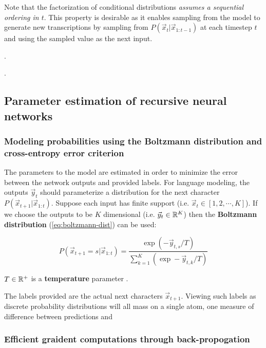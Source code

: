 Note that the factorization of conditional distributions \emph{assumes a
sequential ordering in $t$}. This property is desirable as it enables sampling
from the model to generate new transcriptions by sampling from $P(\vec{x}_t |
\vec{x}_{1:t-1})$ at each timestep $t$ and using the sampled value as the next
input.

.

.

\subsection{Parameter estimation of recursive neural networks}

\subsubsection{Modeling probabilities using the Boltzmann distribution and cross-entropy error criterion}

The parameters to the model are estimated in order to minimize the error
between the network outputs and provided labels. For language modeling, the
outputs $\vec{y}_t$ should parameterize a distribution for the next character
$P(\vec{x}_{t+1} | \vec{x}_{1:t})$. Suppose each input has finite support (i.e.
$\vec{x}_t \in [1,2,\cdots,K]$). If we choose the outputs to be $K$ dimensional
(i.e. $\vec{y}_t \in \mathbb{R}^K$) then the \textbf{Boltzmann distribution}
(\autoref{eq:boltzmann-dist}) can be used:

\begin{equation}
    \label{eq:boltzmann-dist}
    P(\vec{x}_{t+1} = s | \vec{x}_{1:t})
    = \frac{\exp \left(-\vec{y}_{t,s}/T\right) }{ \sum_{k=1}^{K} \left(\exp -\vec{y}_{t,k}/T\right)}
\end{equation}

$T \in \mathbb{R}^+$ is a \textbf{temperature} parameter .

The labels provided are the actual next characters $\vec{x}_{t+1}$. Viewing
such labels as discrete probability distributions will all mass on a single atom,
one measure of difference between predictions and 

\subsubsection{Efficient graident computations through back-propogation}

